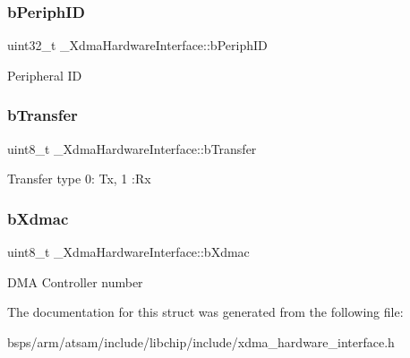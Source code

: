 \subsubsection{\texorpdfstring{bPeriphID}{bPeriphID}}
{\footnotesize\ttfamily uint32\+\_\+t \+\_\+\+Xdma\+Hardware\+Interface\+::b\+Periph\+ID}

Peripheral ID \mbox{\label{struct__XdmaHardwareInterface_a42f348c18682e5bc07006652d08144bb}} 
\subsubsection{\texorpdfstring{bTransfer}{bTransfer}}
{\footnotesize\ttfamily uint8\+\_\+t \+\_\+\+Xdma\+Hardware\+Interface\+::b\+Transfer}

Transfer type 0\+: Tx, 1 \+:Rx \mbox{\label{struct__XdmaHardwareInterface_a0ec1de1fb532fa4c1f1072735201ae7f}} 
\subsubsection{\texorpdfstring{bXdmac}{bXdmac}}
{\footnotesize\ttfamily uint8\+\_\+t \+\_\+\+Xdma\+Hardware\+Interface\+::b\+Xdmac}

D\+MA Controller number 

The documentation for this struct was generated from the following file\+:\begin{DoxyCompactItemize}
\item 
bsps/arm/atsam/include/libchip/include/xdma\+\_\+hardware\+\_\+interface.\+h\end{DoxyCompactItemize}
